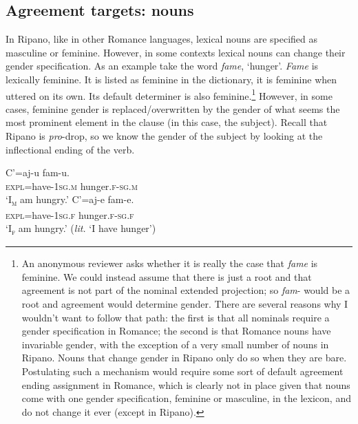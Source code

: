 \documentclass[output=paper
,modfonts
,nonflat]{langsci/langscibook}
\begin{document}
\subsection{Agreement targets: nouns} \label{sec-dalessandro:1.4}
In Ripano, like in other Romance languages, lexical nouns are specified as masculine or feminine. However, in some contexts lexical nouns can change their gender specification. As an example take the word \textit{fame}, ‘hunger’. \textit{Fame} is lexically feminine. It is listed as feminine in the dictionary, it is feminine when uttered on its own. Its default determiner is also feminine.\footnote{An anonymous reviewer asks whether it is really the case that \textit{fame} is feminine. We could instead assume that there is just a root and that agreement is not part of the nominal extended projection; so \textit{fam}- would be a root and agreement would determine gender. There are several reasons why I wouldn’t want to follow that path: the first is that all nominals require a gender specification in Romance; the second is that Romance nouns have invariable gender, with the exception of a very small number of nouns in Ripano. Nouns that change gender in Ripano only do so when they are bare. Postulating such a mechanism would require some sort of default agreement ending assignment in Romance, which is clearly not in place given that nouns come with one gender specification, feminine or masculine, in the lexicon, and do not change it ever (except in Ripano).} 
However, in some cases, feminine gender is replaced/overwritten by the gender of what seems the most prominent element in the clause (in this case, the subject). Recall that Ripano is \textit{pro}-drop, so we know the gender of the subject by looking at the inflectional ending of the verb.

\begin{exe}
	\ex \label{ex-dalessandro:8}\xlist
	\ex 
	\gll C\footnotemark’=aj-u     fam-u. \\
	\textsc{expl}=have-\textsc{1sg.m} hunger.\textsc{f-sg.m}\\
	\glt `I\textsc{\textsubscript{m}} am hungry.' 
	\ex
	\gll  C’=aj-e    fam-e.\\
	\textsc{expl}=have-\textsc{1sg.f} hunger.\textsc{f-sg.f}\\
	\glt `I\textsc{\textsubscript{f}} am hungry.' (\textit{lit.} `I have hunger')
	\endxlist
\end{exe}
\end{document}
